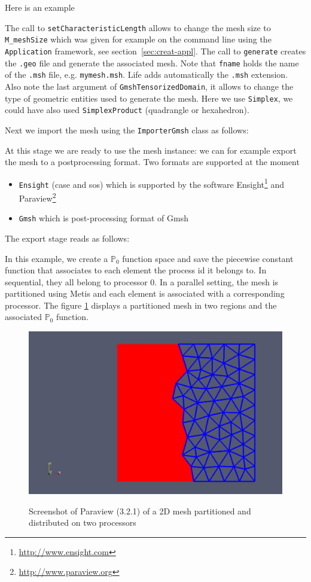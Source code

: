 \documentclass[11pt]{article}
\newcommand{\polyP}[1]{\ensuremath{\mathbb{P}_{#1}}\xspace}
\begin{document}
Here is an example



The call to \lstinline!setCharacteristicLength! allows to change the
mesh size to \lstinline!M_meshSize! which was given for example on the
command line using the \lstinline!Application! framework, see
section~\ref{sec:creat-appl}. The call to \lstinline!generate! creates
the \lstinline!.geo! file and generate the associated mesh. Note that
\lstinline!fname! holds the name of the \lstinline!.msh! file,
e.g. \lstinline!mymesh.msh!. Life adds automatically the
\lstinline!.msh!  extension. Also note the last argument of
\lstinline!GmshTensorizedDomain!, it allows to change the type of
geometric entities used to generate the mesh. Here we use
\lstinline!Simplex!, we could have also used
\lstinline!SimplexProduct! (quadrangle or hexahedron).


Next we import the mesh using the \lstinline!ImporterGmsh! class as follows:




At this stage we are ready to use the mesh instance: we can for
example export the mesh to a postprocessing format. Two formats are
supported at the moment
\begin{itemize}
\item \lstinline!Ensight! (case and sos) which is supported by the
  software Ensight\footnote{\url{http://www.ensight.com}} and
  Paraview\footnote{\url{http://www.paraview.org}}
\item \lstinline!Gmsh! which is post-processing format of Gmsh
\end{itemize}

The export stage reads as follows:



In this example, we create a $\polyP{0}$ function space and save the
piecewise constant function that associates to each element the
process id it belongs to. In sequential, they all belong to processor
0.  In a parallel setting, the mesh is partitioned using Metis and
each element is associated with a corresponding processor. The figure
\ref{fig:1} displays a partitioned mesh in two regions and the
associated $\polyP{0}$ function.

\begin{figure}[htbp]
  \centering
  \includegraphics[width=.7\linewidth]{mymeshpartition}
  \label{fig:1}
  \caption{Screenshot of Paraview (3.2.1) of a 2D mesh partitioned and distributed on two processors}
\end{figure}
\end{document}
